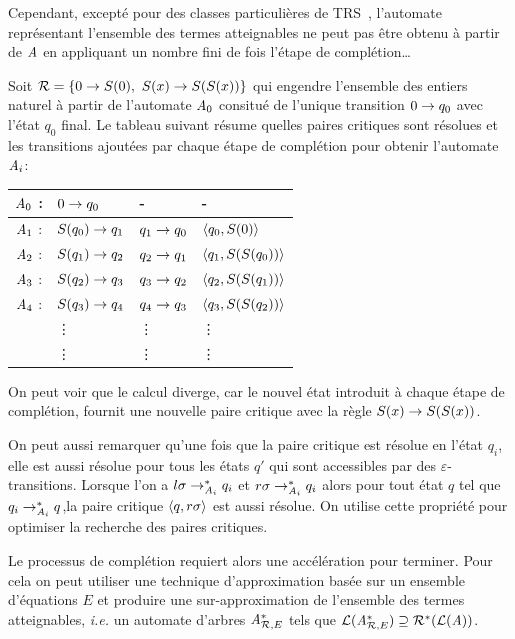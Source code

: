 Cependant, excepté pour des classes particulières de TRS~\cite{FeuilladeGVTT-JAR04,Genet-Habil},
l'automate représentant l'ensemble des termes atteignables ne peut pas être obtenu
à partir de $\mathit A$ en appliquant un nombre fini de fois l'étape de complétion\dots


\begin{example}
  Soit $\mathcal R = \{0 \rightarrow S(0),\ S(x) \rightarrow S(S(x))\}$ qui engendre l'ensemble des entiers naturel
  à partir de l'automate $\mathit A_0$ consitué de l'unique transition $0 \rightarrow q_0$ avec l'état $q_0$ final.
  Le tableau suivant résume quelles paires critiques sont résolues et les transitions ajoutées par chaque étape de complétion
  pour obtenir l'automate $\mathit A_i$:
  \begin{center}
    \begin{tabular}{|cll||l|}
      \hline
      $\mathit A_0$ : & $0 \rightarrow q_0$ & - & - \\
      \hline
      $\mathit A_1$ : & $S (q_0) \rightarrow q_1$ & $q_1 \rightarrow q_0$ & $\langle q_0, S(0)\rangle$\\
      \hline
      $\mathit A_2$ : & $S (q_1) \rightarrow q_2$ & $q_2 \rightarrow q_1$ & $\langle q_1, S(S(q_0))\rangle$\\
      \hline
      $\mathit A_3$ : & $S (q_2) \rightarrow q_3$ & $q_3 \rightarrow q_2$ & $\langle q_2, S(S(q_1))\rangle$\\
      \hline
      $\mathit A_4$ : & $S (q_3) \rightarrow q_4$ & $q_4 \rightarrow q_3$ & $\langle q_3, S(S(q_2))\rangle$\\
      & \vdots & \vdots & \vdots \\
      & \vdots & \vdots & \vdots \\
      \hline
    \end{tabular}
  \end{center}

  On peut voir que le calcul diverge, car le nouvel état introduit
  à chaque étape de complétion, fournit une nouvelle paire critique avec la règle $S(x) \rightarrow S(S(x))$.

  On peut aussi remarquer qu'une fois que la paire critique est résolue en l'état $q_i$,
  elle est aussi résolue pour tous les états $q'$ qui sont accessibles par des $\varepsilon$-transitions.
  Lorsque l'on a $l\sigma \rightarrow^*_{\mathit A_i} q_i$ et $r\sigma \rightarrow^*_{\mathit A_i} q_i$ alors pour tout état $q$ tel
  que $q_i \rightarrow^*_{\mathit A_i} q$,la paire critique $\langle q, r\sigma\rangle$ est aussi résolue. On utilise cette
  propriété pour optimiser la recherche des paires critiques.
\end{example}


Le processus de complétion requiert alors une accélération pour terminer. Pour cela on peut
utiliser une technique d'approximation basée sur un ensemble d'équations $E$ et produire 
une sur-approximation de l'ensemble des termes atteignables, \textit{i.e.} un automate d'arbres
$\mathit A^*_{\mathcal R,E}$ tels que $\mathcal{L}(\mathit A^*_{\mathcal R,E}) \supseteq \mathcal R^*(\mathcal{L}(\mathit A))$.

